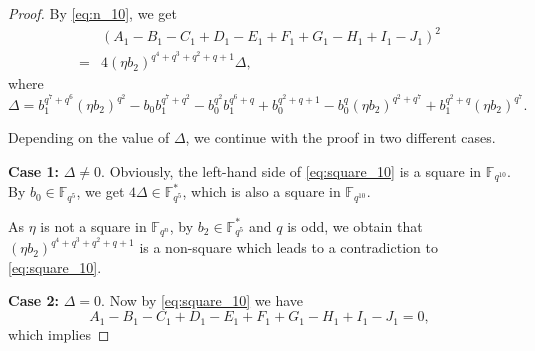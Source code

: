\documentclass{amsart}
\theoremstyle{plain}
\theoremstyle{definition}
\newcommand{\F}{\mathbb F}
\newcommand{\fqn}{\mathbb{F}_{q^n}}
\begin{document}
\begin{proof}
		By \eqref{eq:n_10}, we get 
		\begin{equation}\label{eq:square_10}
			\begin{aligned}
				&(A_1-B_1-C_1+D_1-E_1+F_1+G_1-H_1+I_1-J_1)^2\\
				=&4(\eta b_2)^{q^4+q^3+q^2+q+1}\Delta,
			\end{aligned}
		\end{equation}
		where
		\[
		\Delta = b_1^{q^7+q^6}(\eta b_2)^{q^2}-b_0b_1^{q^7+q^2}-b_0^{q^2}b_1^{q^6+q}+b_0^{q^2+q+1}-b_0^q(\eta b_2)^{q^2+q^7}+b_1^{q^2+q}(\eta b_2)^{q^7}.
		\]
		
		
		Depending on the value of $\Delta$, we continue with the proof in two different cases.
		
		\medskip
		
		\noindent\textbf{Case 1:}  $\Delta\neq 0$.	Obviously, the left-hand side of \eqref{eq:square_10} is a square in $\F_{q^{10}}$.
		By $b_0\in\mathbb{F}_{q^5}$, we get \(4\Delta\in\mathbb{F}_{q^5}^*\), which is also a square in $\F_{q^{10}}$.
		
		As $\eta$ is not a square in $\fqn$, by $b_2\in\mathbb{F}_{q^5}^*$ and $q$ is odd, we obtain that \((\eta b_2)^{q^4+q^3+q^2+q+1}\) is a non-square which leads to a contradiction to \eqref{eq:square_10}.
		
		\medskip
		
		\noindent\textbf{Case 2:}  $\Delta=0$. Now
		by \eqref{eq:square_10} we have 
		\begin{equation}\label{eq:equal_0}
			A_1-B_1-C_1+D_1-E_1+F_1+G_1-H_1+I_1-J_1=0,
		\end{equation}
		which implies 
		

\end{proof}
\end{document}
